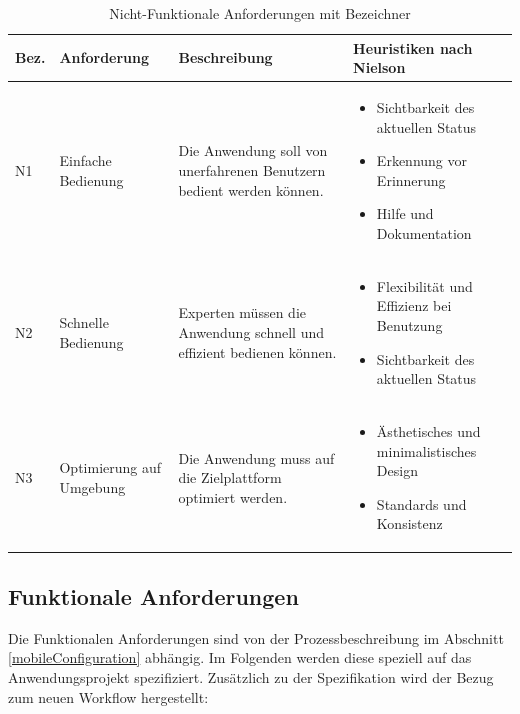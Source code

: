 \begin{table}
\begin{tabular}{| p{0.7cm} | p{2.2cm} | p{4.5cm} | p{5.5cm}|}
\toprule[2pt] \rowcolor{dunkelgrau}
\hline
  Bez. & Anforderung & Beschreibung & Heuristiken nach Nielson \\
  \hline
  N1 & Einfache \newline Bedienung & Die Anwendung soll von unerfahrenen Benutzern bedient werden können.& \begin{itemize}
          \item Sichtbarkeit des aktuellen Status
          \item Erkennung vor Erinnerung
          \item Hilfe und Dokumentation
  \end{itemize} \\
  \hline
  N2 & Schnelle \newline Bedienung & Experten müssen die Anwendung schnell und effizient bedienen können. & \begin{itemize}
            \item Flexibilität und Effizienz bei Benutzung
            \item Sichtbarkeit des aktuellen Status
    \end{itemize}  \\
  \hline
    N3 & Optimierung auf Umgebung & Die Anwendung muss auf die Zielplattform optimiert werden. &  \begin{itemize}
              \item Ästhetisches und minimalistisches Design
              \item Standards und Konsistenz
      \end{itemize} \\
    \hline
\bottomrule[2pt]
\end{tabular}
\caption{Nicht-Funktionale Anforderungen mit Bezeichner}
\label{nonFunctionalRequ}
\end{table}

\subsection{Funktionale Anforderungen}\label{functionRequ}
Die Funktionalen Anforderungen sind von der Prozessbeschreibung im Abschnitt \ref{mobileConfiguration} abhängig. Im Folgenden werden diese speziell auf das Anwendungsprojekt spezifiziert. Zusätzlich zu der Spezifikation wird der Bezug zum neuen Workflow hergestellt:

